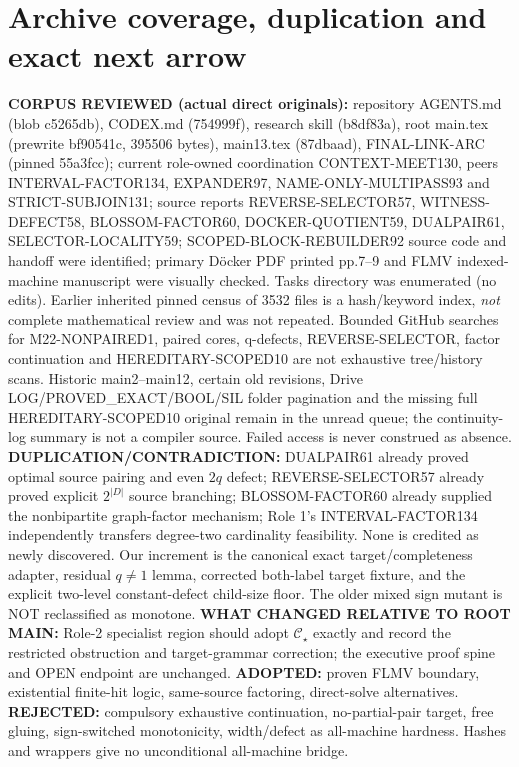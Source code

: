 \documentclass[10pt]{article}
\begin{document}
\section{Archive coverage, duplication and exact next arrow}
\textbf{CORPUS REVIEWED (actual direct originals):} repository AGENTS.md (blob c5265db), CODEX.md (754999f), research skill (b8df83a), root main.tex (prewrite bf90541c, 395506 bytes), main13.tex (87dbaad), FINAL-LINK-ARC (pinned 55a3fcc); current role-owned coordination CONTEXT-MEET130, peers INTERVAL-FACTOR134, EXPANDER97, NAME-ONLY-MULTIPASS93 and STRICT-SUBJOIN131; source reports REVERSE-SELECTOR57, WITNESS-DEFECT58, BLOSSOM-FACTOR60, DOCKER-QUOTIENT59, DUALPAIR61, SELECTOR-LOCALITY59; SCOPED-BLOCK-REBUILDER92 source code and handoff were identified; primary D\"ocker PDF printed pp.7--9 and FLMV indexed-machine manuscript were visually checked. Tasks directory was enumerated (no edits). Earlier inherited pinned census of 3532 files is a hash/keyword index, \emph{not} complete mathematical review and was not repeated. Bounded GitHub searches for M22-NONPAIRED1, paired cores, q-defects, REVERSE-SELECTOR, factor continuation and HEREDITARY-SCOPED10 are not exhaustive tree/history scans. Historic main2--main12, certain old revisions, Drive LOG/PROVED\_EXACT/BOOL/SIL folder pagination and the missing full HEREDITARY-SCOPED10 original remain in the unread queue; the continuity-log summary is not a compiler source. Failed access is never construed as absence.
\textbf{DUPLICATION/CONTRADICTION:} DUALPAIR61 already proved optimal source pairing and even \(2q\) defect; REVERSE-SELECTOR57 already proved explicit \(2^{|D|}\) source branching; BLOSSOM-FACTOR60 already supplied the nonbipartite graph-factor mechanism; Role 1's INTERVAL-FACTOR134 independently transfers degree-two cardinality feasibility. None is credited as newly discovered. Our increment is the canonical exact target/completeness adapter, residual \(q\ne1\) lemma, corrected both-label target fixture, and the explicit two-level constant-defect child-size floor. The older mixed sign mutant is NOT reclassified as monotone.
\textbf{WHAT CHANGED RELATIVE TO ROOT MAIN:} Role-2 specialist region should adopt \(\mathcal C_\star\) exactly and record the restricted obstruction and target-grammar correction; the executive proof spine and OPEN endpoint are unchanged. \textbf{ADOPTED:} proven FLMV boundary, existential finite-hit logic, same-source factoring, direct-solve alternatives. \textbf{REJECTED:} compulsory exhaustive continuation, no-partial-pair target, free gluing, sign-switched monotonicity, width/defect as all-machine hardness. Hashes and wrappers give no unconditional all-machine bridge.
\end{document}
